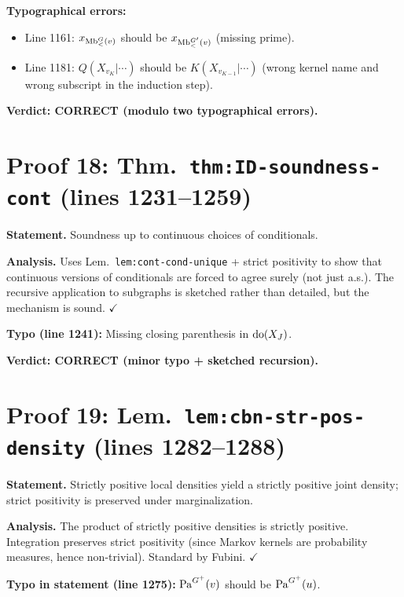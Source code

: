 \documentclass{article}
\begin{document}
\textbf{Typographical errors:}
\begin{itemize}
  \item Line 1161: $x_{\mathrm{Mb}^G_<(v)}$ should be $x_{\mathrm{Mb}^{G'}_<(v)}$ (missing prime).
  \item Line 1181: $Q(X_{v_K}|\cdots)$ should be $K(X_{v_{K-1}}|\cdots)$
    (wrong kernel name and wrong subscript in the induction step).
\end{itemize}

\textbf{Verdict: CORRECT (modulo two typographical errors).}

\section{Proof 18: Thm.\ \texttt{thm:ID-soundness-cont} (lines 1231--1259)}

\textbf{Statement.} Soundness up to continuous choices of conditionals.

\textbf{Analysis.}
Uses Lem.\ \texttt{lem:cont-cond-unique} + strict positivity to show that
continuous versions of conditionals are forced to agree surely (not just a.s.).
The recursive application to subgraphs is sketched rather than detailed,
but the mechanism is sound.  $\checkmark$

\textbf{Typo (line 1241):} Missing closing parenthesis in $\operatorname{do}(X_J)$.

\textbf{Verdict: CORRECT (minor typo + sketched recursion).}

\section{Proof 19: Lem.\ \texttt{lem:cbn-str-pos-density} (lines 1282--1288)}

\textbf{Statement.} Strictly positive local densities yield a strictly positive
joint density; strict positivity is preserved under marginalization.

\textbf{Analysis.}
The product of strictly positive densities is strictly positive.
Integration preserves strict positivity (since Markov kernels are probability
measures, hence non-trivial).  Standard by Fubini.  $\checkmark$

\textbf{Typo in statement (line 1275):} $\mathrm{Pa}^{G^+}(v)$ should be $\mathrm{Pa}^{G^+}(u)$.
\end{document}
